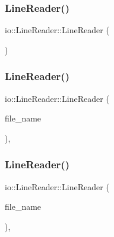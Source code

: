 \subsubsection{\texorpdfstring{Line\+Reader()}{LineReader()}\hspace{0.1cm}{\footnotesize\ttfamily [2/12]}}
{\footnotesize\ttfamily io\+::\+Line\+Reader\+::\+Line\+Reader (\begin{DoxyParamCaption}\item[{const \hyperlink{classio_1_1LineReader}{Line\+Reader} \&}]{ }\end{DoxyParamCaption})\hspace{0.3cm}{\ttfamily [delete]}}

\mbox{\label{classio_1_1LineReader_a81a75d3f53725d35822f490007520e29}} 
\subsubsection{\texorpdfstring{Line\+Reader()}{LineReader()}\hspace{0.1cm}{\footnotesize\ttfamily [3/12]}}
{\footnotesize\ttfamily io\+::\+Line\+Reader\+::\+Line\+Reader (\begin{DoxyParamCaption}\item[{const char $\ast$}]{file\+\_\+name }\end{DoxyParamCaption})\hspace{0.3cm}{\ttfamily [inline]}, {\ttfamily [explicit]}}

\mbox{\label{classio_1_1LineReader_ab0eb26f44fa6b18f9c39dfb2561ac882}} 
\subsubsection{\texorpdfstring{Line\+Reader()}{LineReader()}\hspace{0.1cm}{\footnotesize\ttfamily [4/12]}}
{\footnotesize\ttfamily io\+::\+Line\+Reader\+::\+Line\+Reader (\begin{DoxyParamCaption}\item[{const std\+::string \&}]{file\+\_\+name }\end{DoxyParamCaption})\hspace{0.3cm}{\ttfamily [inline]}, {\ttfamily [explicit]}}

